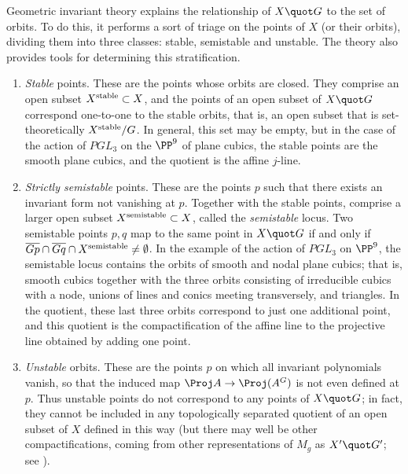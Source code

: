 Geometric invariant theory explains the relationship of $X\quot G$ to the set of orbits. To do this, it performs a sort of triage on the points of $X$ (or their orbits), dividing them into three classes: stable, semistable and unstable. The theory also provides tools for determining this stratification. 
\begin{enumerate}


\item  \emph{Stable} points. These are the points whose orbits are closed. They comprise an open subset $X^{\rm stable} \subset X$, and the points of an open subset of $X\quot G$ correspond one-to-one to the stable orbits, that is, an open subset that is set-theoretically $X^{\rm stable}/G$. In general, this set may be empty, but in the case of the action of $PGL_3$ on the $\PP^9$ of plane cubics, the stable points are the smooth plane cubics, and the quotient is the affine $j$-line.

\item \emph{Strictly semistable} points. These are the points $p$ such that there exists an invariant form not vanishing at $p$.  Together with the stable points, comprise a larger open subset $X^{\rm{semistable}} \subset X$, called the \emph{semistable} locus. Two  semistable points $p,q$ map to the same point in $X\quot G$ if and only if $\overline{Gp}\cap \overline{Gq}\cap X^{\rm{semistable}} \neq \emptyset$. In the example of the action of $PGL_3$ on  $\PP^9$, the semistable  locus contains  the orbits of smooth and nodal plane cubics; that is, smooth cubics together with the three orbits consisting of irreducible cubics with a node, unions of lines and conics meeting transversely, and triangles. In the quotient, these last three orbits correspond to just one additional point, and this quotient is the compactification of the affine line to the projective line obtained by adding one point.

\item  \emph{Unstable} orbits. These are the points $p$ on which all invariant polynomials vanish, so that the induced map
$\Proj A \to \Proj (A^G)$ is not even defined at $p$. Thus unstable points do not correspond to any points of $X\quot G$; in fact, they cannot be included in any topologically separated quotient of an open subset of $X$ defined in this way (but there may well be other compactifications, coming from
other representations of $M_g$ as $X'\quot  G'$; see \cite{MR3044128}).
\end{enumerate}


